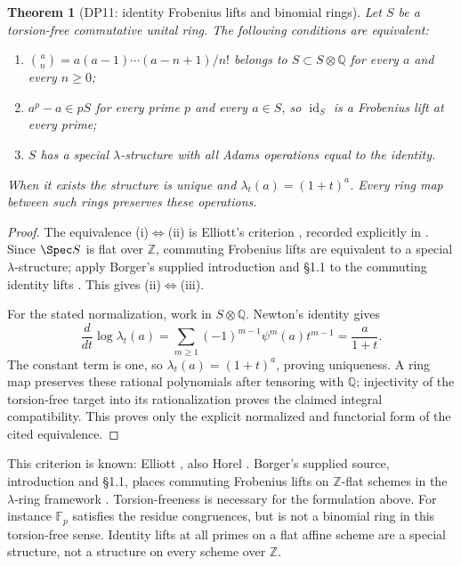 \documentclass[11pt,a4paper]{article}
\newtheorem{theorem}{Theorem}[section]
\theoremstyle{definition}\newtheorem{remark}[theorem]{Remark}
\newcommand{\Z}{\mathbb Z}\newcommand{\Q}{\mathbb Q}\newcommand{\F}{\mathbb F}
\newcommand{\id}{\operatorname{id}}\newcommand{\Hom}{\operatorname{Hom}}
\begin{document}
\begin{theorem}[DP11: identity Frobenius lifts and binomial rings]\label{DP11}
Let $S$ be a torsion-free commutative unital ring. The following conditions are equivalent:
\begin{enumerate}[label=(\roman*)]
\item $\binom an=a(a-1)\cdots(a-n+1)/n!$ belongs to $S\subset S\otimes\Q$ for every $a$ and every $n\ge0$;
\item $a^p-a\in pS$ for every prime $p$ and every $a\in S$, so $\id_S$ is a Frobenius lift at every prime;
\item $S$ has a special $\lambda$-structure with all Adams operations equal to the identity.
\end{enumerate}
When it exists the structure is unique and $\lambda_t(a)=(1+t)^a$. Every ring map between such rings preserves these operations.
\end{theorem}
\begin{proof}
The equivalence (i)$\Leftrightarrow$(ii) is Elliott's criterion \cite[Theorem 4.1]{Elliott}, recorded explicitly in \cite[Remark 1.3]{Horel}. Since $\Spec S$ is flat over $\Z$, commuting Frobenius lifts are equivalent to a special $\lambda$-structure; apply Borger's supplied introduction and \S1.1 to the commuting identity lifts \cite{Borger}. This gives (ii)$\Leftrightarrow$(iii).

For the stated normalization, work in $S\otimes\Q$. Newton's identity gives
\[
 \frac{d}{dt}\log\lambda_t(a)
 =\sum_{m\ge1}(-1)^{m-1}\psi^m(a)t^{m-1}
 =\frac{a}{1+t}.
\]
The constant term is one, so $\lambda_t(a)=(1+t)^a$, proving uniqueness. A ring map preserves these rational polynomials after tensoring with $\Q$; injectivity of the torsion-free target into its rationalization proves the claimed integral compatibility. This proves only the explicit normalized and functorial form of the cited equivalence.
\end{proof}

This criterion is known: Elliott \cite[Theorem 4.1 and Proposition 8.3]{Elliott}, also Horel \cite[Definition 1.1 and Remark 1.3]{Horel}. Borger's supplied source, introduction and \S1.1, places commuting Frobenius lifts on $\Z$-flat schemes in the $\lambda$-ring framework \cite{Borger}. Torsion-freeness is necessary for the formulation above. For instance $\F_p$ satisfies the residue congruences, but is not a binomial ring in this torsion-free sense. Identity lifts at all primes on a flat affine scheme are a special structure, not a structure on every scheme over $\Z$.
\end{document}
